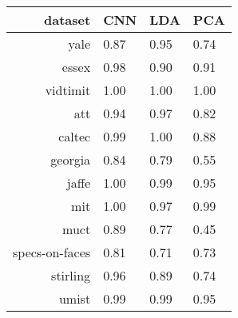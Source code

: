 \begin{tabular}{|r|l|l|l|}
  \hline
  \rowcolor{Gray}
  dataset & CNN & LDA & PCA \\
  \hline
  yale & 0.87 & 0.95 & 0.74 \\
  \hline
  essex & 0.98 & 0.90 & 0.91 \\
  \hline
  vidtimit & 1.00 & 1.00 & 1.00 \\
  \hline
  att & 0.94 & 0.97 & 0.82 \\
  \hline
  caltec & 0.99 & 1.00 & 0.88 \\
  \hline
  georgia & 0.84 & 0.79 & 0.55 \\
  \hline
  jaffe & 1.00 & 0.99 & 0.95 \\
  \hline
  mit & 1.00 & 0.97 & 0.99 \\
  \hline
  muct & 0.89 & 0.77 & 0.45 \\
  \hline
  specs-on-faces & 0.81 & 0.71 & 0.73 \\
  \hline
  stirling & 0.96 & 0.89 & 0.74 \\
  \hline
  umist & 0.99 & 0.99 & 0.95 \\
  \hline
\end{tabular}
